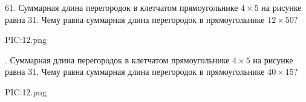 61. Суммарная длина перегородок в клетчатом прямоугольнике $4\times5$ на рисунке равна 31. Чему равна суммарная длина перегородок в прямоугольнике $12\times50?$
\begin{center}
{{PIC:12.png}}
\end{center}
\newpage
{}. Суммарная длина перегородок в клетчатом прямоугольнике $4\times5$ на рисунке равна 31. Чему равна суммарная длина перегородок в прямоугольнике $40\times15?$
\begin{center}
{{PIC:12.png}}
\end{center}
